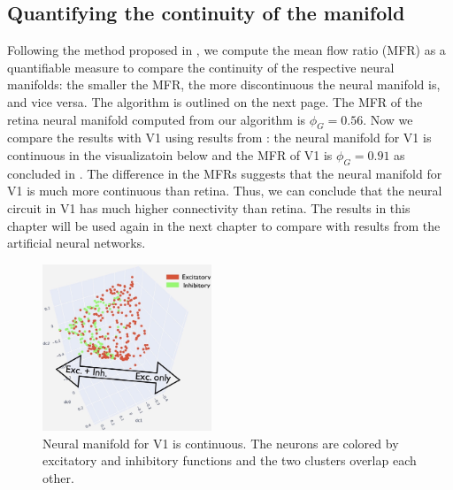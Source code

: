 \subsection{Quantifying the continuity of the manifold}
Following the method proposed in \cite{dyballa_manifold_2021}, we compute the mean flow ratio (MFR) as a quantifiable measure to compare the continuity of the respective neural manifolds: the smaller the MFR, the more discontinuous the neural manifold is, and vice versa. The algorithm is outlined on the next page. The MFR of the retina neural manifold computed from our algorithm is $\phi_G = 0.56$. Now we compare the results with V1 using results from \cite{dyballa_manifold_2021}: the neural manifold for V1 is continuous in the visualizatoin below and the MFR of V1 is $\phi_G = 0.91$ as concluded in . The difference in the MFRs suggests that the neural manifold for V1 is much more continuous than retina. Thus, we can conclude that the neural circuit in V1 has much higher connectivity than retina. The results in this chapter will be used again in the next chapter to compare with results from the artificial neural networks.
 \begin{figure}[H]
        \centering
             \includegraphics[width=0.45\textwidth]{figures/biological/v1-manifold.jpg}
            \caption{Neural manifold for V1 is continuous. The neurons are colored by excitatory and inhibitory functions and the two clusters overlap each other.}
        \end{figure} 

